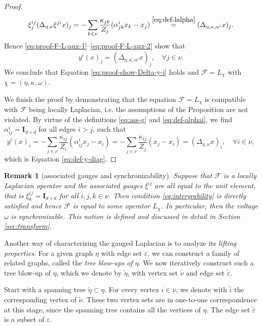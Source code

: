 \documentclass[10pt,reqno]{amsart}
\numberwithin{equation}{section}
\theoremstyle{bfnote}
\theoremstyle{bfdef}
\newtheorem{remark}[theorem]{Remark}
\newcommand{\mc}[1]{\mathcal{#1}}
\newcommand{\veps}{\varepsilon}
\newcommand{\II}{\mathbf{I}_{d \times d}}
\begin{document}
\begin{proof}
\begin{equation}
			\xi^{ij}_{j}(\Delta_{\eta,\kappa} \xi^{ji}x)_{j}
			= -\sum_{k \in \nu} \frac{\kappa_{jk}}{Z_{j}}(\alpha_{jk}^{i} x_{k} - x_j)
			\overset{\eqref{eq:def-lalpha}}{=} (\Delta_{\eta,\kappa,\alpha^{i}}x)_{j}.
		\end{equation}
		Hence \eqref{eq:proof-F-L-aux-1}--\eqref{eq:proof-F-L-aux-2} show that
		\begin{equation}
			y^{i}(x)_{j} = (\Delta_{\eta,\kappa,\alpha^{i}}x)_{j}, \quad \forall j \in \nu.
		\end{equation}
		We conclude that Equation \eqref{eq:proof-show-Delta-y-i} holds and $\mc{F} = L_{\chi}$ with $\chi=(\eta,\kappa,\omega)$.

		We finish the proof by demonstrating that the equation $\mc{F} = L_{\chi}$ is compatible with $\mc{F}$ being locally Laplacian, i.e. the assumptions of the Proposition are not violated. By virtue of the definitions \eqref{eq:ass-g} and \eqref{eq:def-alphai}, we find $\alpha^{i}_{ij} =\II$ for all edges $i>j$, such that
			\begin{equation}
				y^{i}(x)_{i}
				= - \sum_{j\in\nu}\frac{\kappa_{ij}}{Z_{i}}(\alpha^{i}_{ij} x_{j} - x_{i})
				= - \sum_{j \in \nu} \frac{\kappa_{ij}}{Z_{j}}(x_{j} - x_{i})
				= (\Delta_{\eta,\kappa} x)_{i}, \quad \forall i \in \nu,
			\end{equation}
		which is Equation \eqref{eq:def-y-diag}.
	\end{proof}


	\begin{remark}[associated gauges and synchronizability]
		Suppose that $\mc{F}$ is a locally Laplacian operator and the associated gauges $\xi^{ij}$ are all equal to the unit element, that is $\xi^{ij}_{k} = \II$ for all $i,j,k \in \nu$. Then condition \eqref{eq:intergrability} is directly satisfied and hence $\mc{F}$ is equal to some operator $L_{\chi}$.
		In particular, then the voltage $\omega$ is \textit{synchronizable}. This notion is defined and discussed in detail in Section \ref{sec:transform}.
	\end{remark}

	Another way of characterizing the gauged Laplacian is to analyze its \textit{lifting properties}. For a given graph $\eta$ with edge set $\veps$, we can construct a family of related graphs, called the \textit{tree blow-ups of $\eta$}. We now iteratively construct such a tree blow-up of $\eta$, which we denote by $\tilde \eta$, with vertex set $\tilde \nu$ and edge set $\tilde \veps$.

	Start with a spanning tree $\tilde\eta \subset \eta$. For every vertex $i\in\nu$, we denote with $\tilde{i}$ the corresponding vertex of $\tilde\nu$. These two vertex sets are in one-to-one correspondence at this stage, since the spanning tree contains all the vertices of $\eta$. The edge set $\tilde \veps$ is a subset of $\veps$. 
\end{document}
